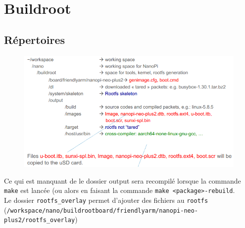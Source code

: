 \documentclass[resume]{subfiles}
\begin{document}
\section{Buildroot}
\subsection{Répertoires}
\begin{figure}[H]
\centering
\includegraphics[width=\columnwidth]{img_1.png}
\end{figure}
Ce qui est manquant de le dossier output sera recompilé lorsque la commande \verb!make! est lancée (ou alors en faisant la commande \verb!make <package>-rebuild!.\\
Le dossier \verb!rootfs_overlay! permet d'ajouter des fichiers au \verb!rootfs!
(\verb!/workspace/nano/buildrootboard/friendlyarm/nanopi-neo-plus2/rootfs_overlay!)
\end{document}
